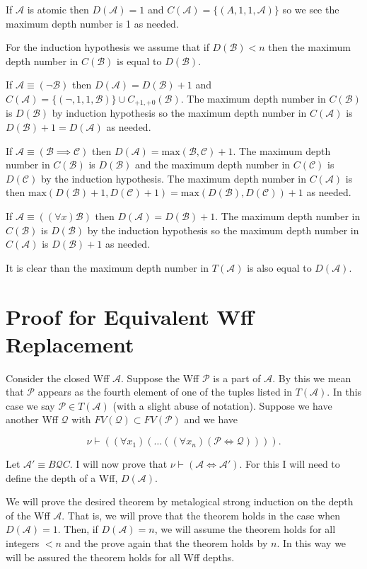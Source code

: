 \documentclass[12pt]{article}
\theoremstyle{break}
\theoremstyle{break}
\theoremstyle{break}
\theoremstyle{break}
\theoremstyle{break}
\newtheorem{informal definition}[definition]{Informal Definition}
\newcommand{\mc}[1]{\mathcal{#1}}
\begin{document}
If $\mc{A}$ is atomic then $D(\mc{A}) = 1$ and $C(\mc{A}) = \{(A, 1, 1, \mc{A})\}$ so we see the maximum depth number is 1 as needed.

For the induction hypothesis we assume that if $D(\mc{B}) < n$ then the maximum depth number in $C(\mc{B})$ is equal to $D(\mc{B})$.

If $\mc{A} \equiv (\lnot \mc{B})$ then $D(\mc{A}) = D(\mc{B}) + 1$ and $C(\mc{A}) = \{(\lnot, 1, 1, \mc{B})\} \cup C_{+1, +0}(\mc{B})$. The maximum depth number in $C(\mc{B})$ is $D(\mc{B})$ by induction hypothesis so the maximum depth number in $C(\mc{A})$ is $D(\mc{B}) + 1 = D(\mc{A})$ as needed.

If $\mc{A} \equiv (\mc{B} \implies \mc{C})$ then $D(\mc{A}) = \text{max}(\mc{B}, \mc{C}) + 1$. The maximum depth number in $C(\mc{B})$ is $D(\mc{B})$ and the maximum depth number in $C(\mc{C})$ is $D(\mc{C})$ by the induction hypothesis. The maximum depth number in $C(\mc{A})$ is then $\text{max}(D(\mc{B}) + 1, D(\mc{C})+1) = \text{max}(D(\mc{B}), D(\mc{C})) + 1$ as needed.

If $\mc{A} \equiv ((\forall x)\mc{B})$ then $D(\mc{A}) = D(\mc{B}) + 1$. The maximum depth number in $C(\mc{B})$ is $D(\mc{B})$ by the induction hypothesis so the maximum depth number in $C(\mc{A})$ is $D(\mc{B}) + 1$ as needed.

It is clear than the maximum depth number in $T(\mc{A})$ is also equal to $D(\mc{A})$.

\newpage

\section{Proof for Equivalent Wff Replacement}

Consider the closed Wff $\mc{A}$.
Suppose the Wff $\mc{P}$ is a part of $\mc{A}$. By this we mean that $\mc{P}$ appears as the fourth element of one of the tuples listed in $T(\mc{A})$. In this case we say $\mc{P} \in T(\mc{A})$ (with a slight abuse of notation).
Suppose we have another Wff $\mc{Q}$ with $FV(\mc{Q}) \subset FV(\mc{P})$ and we have

$$
\nu \vdash ((\forall x_1)(\ldots((\forall x_n) (\mc{P} \iff \mc{Q})))).
$$

Let $\mc{A}' \equiv B\mc{Q}C$. I will now prove that $\nu \vdash (\mc{A} \iff \mc{A}')$.
For this I will need to define the depth of a Wff, $D(\mc{A})$.



We will prove the desired theorem by metalogical strong induction on the depth of the Wff $\mc{A}$.
That is, we will prove that the theorem holds in the case when $D(\mc{A}) = 1$.
Then, if $D(\mc{A}) = n$, we will assume the theorem holds for all integers $<n$ and the prove again that the theorem holds by $n$.
In this way we will be assured the theorem holds for all Wff depths.
\end{document}

